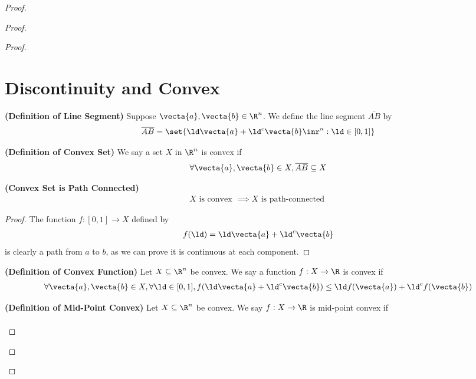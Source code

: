 \documentclass{report}
\begin{document}
\begin{proof}
\begin{proof}
\begin{proof}
\section{Discontinuity and Convex}
\begin{definition}
\label{5.2.1}
\textbf{(Definition of Line Segment)} Suppose $\vecta{a},\vecta{b}\in \R^n$. We define the line segment $\overline{AB}$ by 
\begin{align*}
  \overline{AB}=\set{\ld  \vecta{a}+\ld ^c\vecta{b}\inr^n:\ld  \in [0,1]}
\end{align*}
\end{definition}
\begin{definition}
\label{5.2.2}
\textbf{(Definition of Convex Set)} We say a set $X$ in  $\R^n$ is convex if
\begin{align*}
\forall \vecta{a},\vecta{b}\in X,\overline{AB}\subseteq X
\end{align*}
\end{definition}
\begin{theorem}
\label{5.2.3}
\textbf{(Convex Set is Path Connected)} 
\begin{align*}
X\text{ is convex }\implies X\text{ is path-connected }
\end{align*}
\end{theorem}
\begin{proof}
The function $f:[0,1]\rightarrow X$ defined by
\begin{align*}
f(\ld )=\ld \vecta{a}+\ld ^c\vecta{b}
\end{align*}
is clearly a path from $a$ to  $b$, as we can prove it is continuous at each component. 
\end{proof}
\begin{definition}
\label{5.2.4}
\textbf{(Definition of Convex Function)} Let $X\subseteq \R^n$ be convex. We say a function  $f:X\rightarrow \R$ is convex if 
\begin{align*}
\forall \vecta{a},\vecta{b}\in X, \forall \ld \in [0,1], f(\ld \vecta{a}+ \ld ^c\vecta{b})\leq \ld  f(\vecta{a})+\ld ^cf(\vecta{b})
\end{align*}
\end{definition}
\begin{definition}
\label{5.2.5}
\textbf{(Definition of Mid-Point Convex)} Let $X\subseteq \R^n$ be convex. We say $f:X\rightarrow \R$ is mid-point convex if 
\begin{align*}

\end{align*}
\end{definition}
\end{proof}
\end{proof}
\end{proof}
\end{document}
